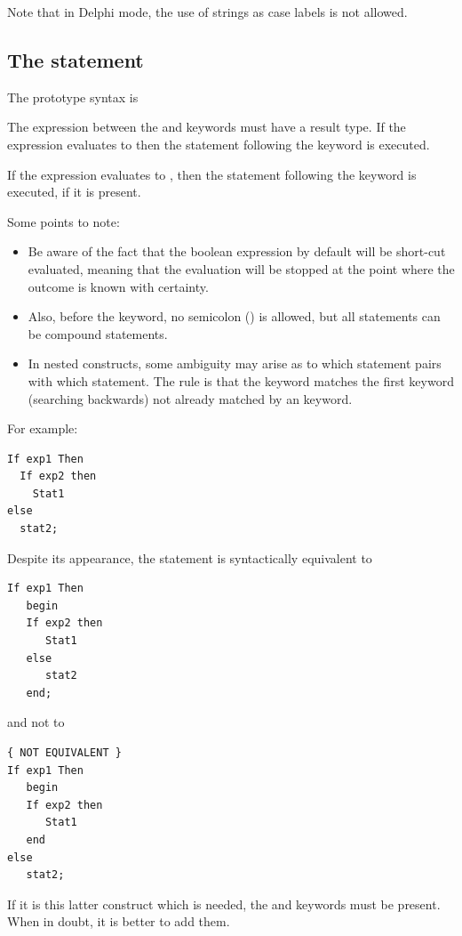 \begin{remark}
Note that in Delphi mode, the use of strings as case labels is not allowed.
\end{remark}

\subsection{The  statement}
The  prototype syntax is

The expression between the  and  keywords must have a
 result type. If the expression evaluates to  then the
statement following the  keyword is executed.

If the expression evaluates to , then the statement following
the  keyword is executed, if it is present.

Some points to note:
\begin{itemize}
\item
Be aware of the fact that the boolean expression by default will be
short-cut evaluated, meaning that the evaluation will be stopped at
the point where the  outcome is known with certainty.
\item
Also, before the  keyword, no semicolon (\var{;}) is allowed,
but all statements can be compound statements.
\item
In nested  constructs, some ambiguity may arise as
to which   statement pairs with which  statement. The rule
is that the  keyword matches the first  keyword
(searching backwards) not already matched by an  keyword.
\end{itemize}
For example:
\begin{verbatim}
If exp1 Then
  If exp2 then
    Stat1
else
  stat2;
\end{verbatim}
Despite its appearance, the statement is syntactically equivalent to
\begin{verbatim}
If exp1 Then
   begin
   If exp2 then
      Stat1
   else
      stat2
   end;
\end{verbatim}
and not to
\begin{verbatim}
{ NOT EQUIVALENT }
If exp1 Then
   begin
   If exp2 then
      Stat1
   end
else
   stat2;
\end{verbatim}
If it is this latter construct which is needed, the  and 
keywords must be present. When in doubt, it is better to add them.

